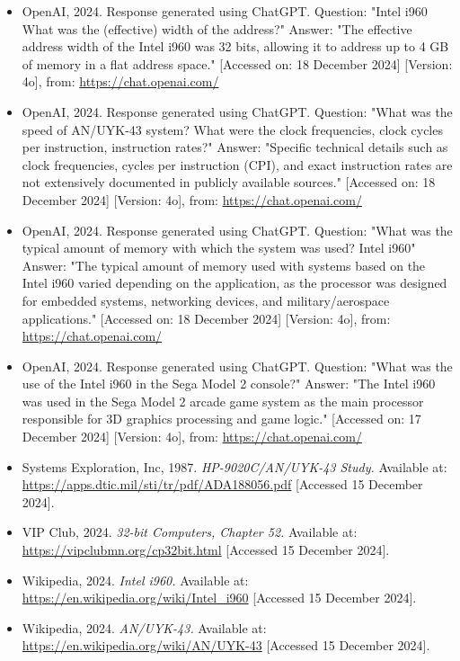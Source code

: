 \documentclass{article}
\begin{document}
\begin{itemize}
\item OpenAI, 2024. Response generated using ChatGPT. Question: "Intel i960 What was the (effective) width of the address?" Answer: "The effective address width of the Intel i960 was 32 bits, allowing it to address up to 4 GB of memory in a flat address space." [Accessed on: 18 December 2024] [Version: 4o], from: \url{https://chat.openai.com/}

\item OpenAI, 2024. Response generated using ChatGPT. Question: "What was the speed of AN/UYK-43 system? What were the clock frequencies, clock cycles per instruction, instruction rates?" Answer: "Specific technical details such as clock frequencies, cycles per instruction (CPI), and exact instruction rates are not extensively documented in publicly available sources." [Accessed on: 18 December 2024] [Version: 4o], from: \url{https://chat.openai.com/}

\item OpenAI, 2024. Response generated using ChatGPT. Question: "What was the typical amount of memory with which the system was used? Intel i960" Answer: "The typical amount of memory used with systems based on the Intel i960 varied depending on the application, as the processor was designed for embedded systems, networking devices, and military/aerospace applications." [Accessed on: 18 December 2024] [Version: 4o], from: \url{https://chat.openai.com/}

\item OpenAI, 2024. Response generated using ChatGPT. Question: "What was the use of the Intel i960 in the Sega Model 2 console?" Answer: "The Intel i960 was used in the Sega Model 2 arcade game system as the main processor responsible for 3D graphics processing and game logic." [Accessed on: 17 December 2024] [Version: 4o], from: \url{https://chat.openai.com/}

\item Systems Exploration, Inc, 1987. \textit{HP-9020C/AN/UYK-43 Study.} Available at: \url{https://apps.dtic.mil/sti/tr/pdf/ADA188056.pdf} [Accessed 15 December 2024].

\item VIP Club, 2024. \textit{32-bit Computers, Chapter 52.} Available at: \url{https://vipclubmn.org/cp32bit.html} [Accessed 15 December 2024].

\item Wikipedia, 2024. \textit{Intel i960.} Available at: \url{https://en.wikipedia.org/wiki/Intel_i960} [Accessed 15 December 2024].

\item Wikipedia, 2024. \textit{AN/UYK-43.} Available at: \url{https://en.wikipedia.org/wiki/AN/UYK-43} [Accessed 15 December 2024].

\end{itemize}
\end{document}
